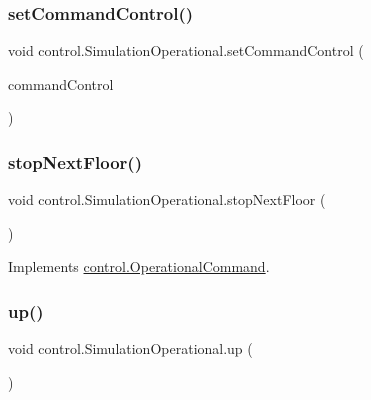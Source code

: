 \mbox{\label{classcontrol_1_1_simulation_operational_a66fd6c0df3888639296a867c106590e3}} 
\subsubsection{\texorpdfstring{setCommandControl()}{setCommandControl()}}
{\footnotesize\ttfamily void control.\+Simulation\+Operational.\+set\+Command\+Control (\begin{DoxyParamCaption}\item[{\mbox{\hyperlink{interfacecontrol_1_1_command_control}{Command\+Control}}}]{command\+Control }\end{DoxyParamCaption})}

\mbox{\label{classcontrol_1_1_simulation_operational_a2ca8414424f8becf5c5942b9dbba80aa}} 
\subsubsection{\texorpdfstring{stopNextFloor()}{stopNextFloor()}}
{\footnotesize\ttfamily void control.\+Simulation\+Operational.\+stop\+Next\+Floor (\begin{DoxyParamCaption}{ }\end{DoxyParamCaption})}



Implements \mbox{\hyperlink{interfacecontrol_1_1_operational_command_a148c09334384843727fb7b1665252ff1}{control.\+Operational\+Command}}.

\mbox{\label{classcontrol_1_1_simulation_operational_ab3ade4511703ee9715f82ce6e9a036a0}} 
\subsubsection{\texorpdfstring{up()}{up()}}
{\footnotesize\ttfamily void control.\+Simulation\+Operational.\+up (\begin{DoxyParamCaption}{ }\end{DoxyParamCaption})}



